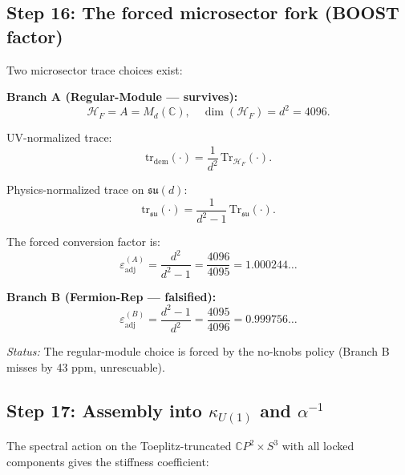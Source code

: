 \documentclass[12pt,a4paper]{article}
\begin{document}
\subsection{Step 16: The forced microsector fork (BOOST factor)}

Two microsector trace choices exist:

\textbf{Branch A (Regular-Module --- survives):}
\begin{equation}\tag{E16a}
\mathcal{H}_F = A = M_d(\mathbb{C}), \quad
\dim(\mathcal{H}_F) = d^2 = 4096.
\end{equation}

UV-normalized trace:
\begin{equation}\tag{E16b}
\mathrm{tr}_{\mathrm{dem}}(\cdot) = \frac{1}{d^2}\,\mathrm{Tr}_{\mathcal{H}_F}(\cdot).
\end{equation}

Physics-normalized trace on $\mathfrak{su}(d)$:
\begin{equation}\tag{E16c}
\mathrm{tr}_{\mathfrak{su}}(\cdot) = \frac{1}{d^2 - 1}\,\mathrm{Tr}_{\mathfrak{su}}(\cdot).
\end{equation}

The forced conversion factor is:
\begin{equation}\tag{E16d}
\boxed{\varepsilon_{\mathrm{adj}}^{(A)} = \frac{d^2}{d^2 - 1}
= \frac{4096}{4095} = 1.000244\ldots}
\end{equation}

\textbf{Branch B (Fermion-Rep --- falsified):}
\begin{equation}\tag{E16e}
\varepsilon_{\mathrm{adj}}^{(B)} = \frac{d^2 - 1}{d^2}
= \frac{4095}{4096} = 0.999756\ldots
\end{equation}

\textit{Status:} The regular-module choice is forced by the no-knobs
policy (Branch B misses by 43 ppm, unrescuable).

\subsection{Step 17: Assembly into $\kappa_{U(1)}$ and $\alpha^{-1}$}

The spectral action on the Toeplitz-truncated $\mathbb{C}P^2 \times S^3$
with all locked components gives the stiffness coefficient:
\end{document}
